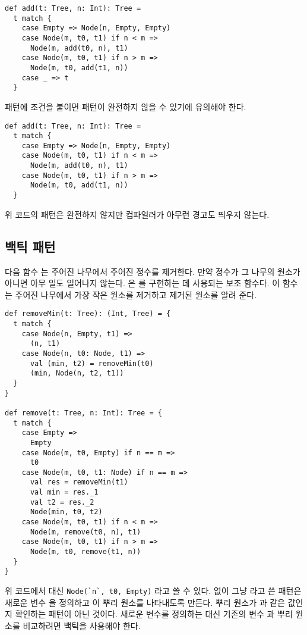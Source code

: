 \begin{verbatim}
def add(t: Tree, n: Int): Tree =
  t match {
    case Empty => Node(n, Empty, Empty)
    case Node(m, t0, t1) if n < m =>
      Node(m, add(t0, n), t1)
    case Node(m, t0, t1) if n > m =>
      Node(m, t0, add(t1, n))
    case _ => t
  }
\end{verbatim}

패턴에 조건을 붙이면 패턴이 완전하지 않을 수 있기에 유의해야 한다.

\begin{verbatim}
def add(t: Tree, n: Int): Tree =
  t match {
    case Empty => Node(n, Empty, Empty)
    case Node(m, t0, t1) if n < m =>
      Node(m, add(t0, n), t1)
    case Node(m, t0, t1) if n > m =>
      Node(m, t0, add(t1, n))
  }
\end{verbatim}

위 코드의 패턴은 완전하지 않지만 컴파일러가 아무런 경고도 띄우지 않는다.

\subsection{백틱 패턴}

다음 함수 는 주어진 나무에서 주어진 정수를 제거한다. 만약 정수가 그
나무의 원소가 아니면 아무 일도 일어나지 않는다. 은
를 구현하는 데 사용되는 보조 함수다. 이 함수는 주어진 나무에서 가장
작은 원소를 제거하고 제거된 원소를 알려 준다.

\begin{verbatim}
def removeMin(t: Tree): (Int, Tree) = {
  t match {
    case Node(n, Empty, t1) =>
      (n, t1)
    case Node(n, t0: Node, t1) =>
      val (min, t2) = removeMin(t0)
      (min, Node(n, t2, t1))
  }
}

def remove(t: Tree, n: Int): Tree = {
  t match {
    case Empty =>
      Empty
    case Node(m, t0, Empty) if n == m =>
      t0
    case Node(m, t0, t1: Node) if n == m =>
      val res = removeMin(t1)
      val min = res._1
      val t2 = res._2
      Node(min, t0, t2)
    case Node(m, t0, t1) if n < m =>
      Node(m, remove(t0, n), t1)
    case Node(m, t0, t1) if n > m =>
      Node(m, t0, remove(t1, n))
  }
}
\end{verbatim}

위 코드에서  대신 \verb!Node(`n`, t0, Empty)!
라고 쓸 수 있다.  없이 그냥 라고 쓴 패턴은 새로운 변수 을 정의하고 이 뿌리 원소를
나타내도록 만든다. 뿌리 원소가 과 같은 값인지 확인하는 패턴이 아닌
것이다. 새로운 변수를 정의하는 대신 기존의 변수 과 뿌리 원소를
비교하려면 백틱을 사용해야 한다.

